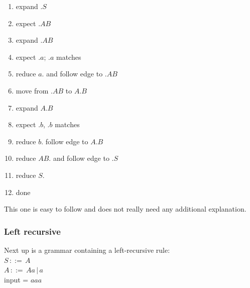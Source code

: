 \documentclass[a4paper,10pt]{article}
\begin{document}
\begin{enumerate}
 \setlength{\itemsep}{0pt}
 \setlength{\parskip}{0pt}
 \setlength{\parsep}{0pt}
 
 \item expand $.S$
 \item expect $.AB$
 \item expand $.AB$
 \item expect $.a$; $.a$ matches
 \item reduce $a.$ and follow edge to $.AB$
 \item move from $.AB$ to $A.B$
 \item expand $A.B$
 \item expect $.b$, $.b$ matches
 \item reduce $b.$ follow edge to $A.B$
 \item reduce $AB.$ and follow edge to $.S$
 \item reduce $S.$
 \item done
\end{enumerate}
This one is easy to follow and does not really need any additional explanation.

\subsubsection{Left recursive}
\label{sec:tracesLeftRecusive}
Next up is a grammar containing a left-recursive rule:\\
$S\,::=\,A$\\
$A\,::=\,Aa\,|\,a$\\
input = $aaa$
\end{document}

